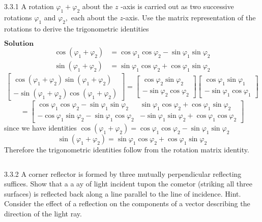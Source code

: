 


\begin{mybox}{3.3.1}
A rotation $\varphi_{1}+\varphi_{2}$ about the $z$ -axis is carried out as two successive rotations $\varphi_{1}$ and $\varphi_{2},$ each about the $z$-axis. Use the matrix representation of the rotations to derive the trigonometric identities
\end{mybox}
$\boxed{\textbf{Solution}}$
$$
\begin{aligned} \cos \left(\varphi_{1}+\varphi_{2}\right) &=\cos \varphi_{1} \cos \varphi_{2}-\sin \varphi_{1} \sin \varphi_{2} \\ \sin \left(\varphi_{1}+\varphi_{2}\right) &=\sin \varphi_{1} \cos \varphi_{2}+\cos \varphi_{1} \sin \varphi_{2} \end{aligned}
$$
$$\begin{bmatrix}{\cos \left(\varphi_{1}+\varphi_{2}\right) \sin \left(\varphi_{1}+\varphi_{2}\right)} \\ {-\sin \left(\varphi_{1}+\varphi_{2}\right) \cos \left(\varphi_{1}+\varphi_{2}\right)}\end{bmatrix}=\begin{bmatrix}{\cos \varphi_{2} \sin \varphi_{2}} \\ {-\sin \varphi_{2} \cos \varphi_{2}}\end{bmatrix}\begin{bmatrix}{\cos \varphi_{1} \sin \varphi_{1}} \\ {-\sin \varphi_{1} \cos \varphi_{1}}\end{bmatrix}$$
$$=\begin{bmatrix}{\cos \varphi_{1} \cos \varphi_{2}-\sin \varphi_{1} \sin \varphi_{2}} & {\sin \varphi_{1} \cos \varphi_{2}+\cos \varphi_{1} \sin \varphi_{2}} \\ {-\cos \varphi_{1} \sin \varphi_{2}-\sin \varphi_{1} \cos \varphi_{2}} & {-\sin \varphi_{1} \sin \varphi_{2}+\cos \varphi_{1} \cos \varphi_{2}}\end{bmatrix}$$
since we have identities $\cos \left(\varphi_{1}+\varphi_{2}\right)=\cos \varphi_{1} \cos \varphi_{2}-\sin \varphi_{1} \sin \varphi_{2}$
$$
\sin \left(\varphi_{1}+\varphi_{2}\right)=\sin \varphi_{1} \cos \varphi_{2}+\cos \varphi_{1} \sin \varphi_{2}
$$
Therefore the trigonometric identities follow from the rotation matrix identity.


$$$$

\begin{mybox}{3.3.2}
A corner reflector is formed by three mutually perpendicular reflecting suffices. Show that a a ay of light incident tupon the cometor (striking all three surfaces) is reflected back along a line parallel to the line of incidence. Hint. Consider the effect of a reflection on the components of a vector describing the direction of the light ray.
\end{mybox}

